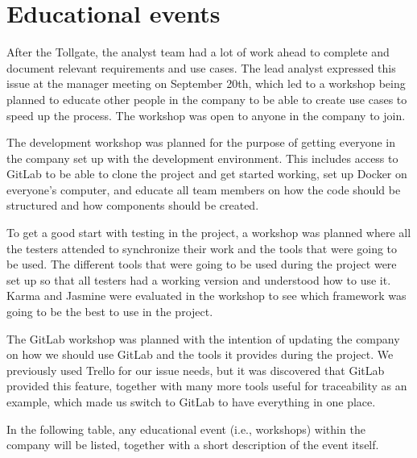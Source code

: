 \section{Educational events}
\label{sec:eduevent}
After the Tollgate, the analyst team had a lot of work ahead to complete and document relevant requirements and use cases. The lead analyst expressed this issue at the manager meeting on September 20th, which led to a workshop being planned to educate other people in the company to be able to create use cases to speed up the process. The workshop was open to anyone in the company to join.

The development workshop was planned for the purpose of getting everyone in the company set up with the development environment. This includes access to GitLab to be able to clone the project and get started working, set up Docker on everyone's computer, and educate all team members on how the code should be structured and how components should be created.

To get a good start with testing in the project, a workshop was planned where all the testers attended to synchronize their work and the tools that were going to be used. The different tools that were going to be used during the project were set up so that all testers had a working version and understood how to use it. Karma and Jasmine were evaluated in the workshop to see which framework was going to be the best to use in the project.

The GitLab workshop was planned with the intention of updating the company on how we should use GitLab and the tools it provides during the project. We previously used Trello for our issue needs, but it was discovered that GitLab provided this feature, together with many more tools useful for traceability as an example, which made us switch to GitLab to have everything in one place.

In the following table, any educational event (i.e., workshops) within the company will be listed, together with a short description of the event itself.

